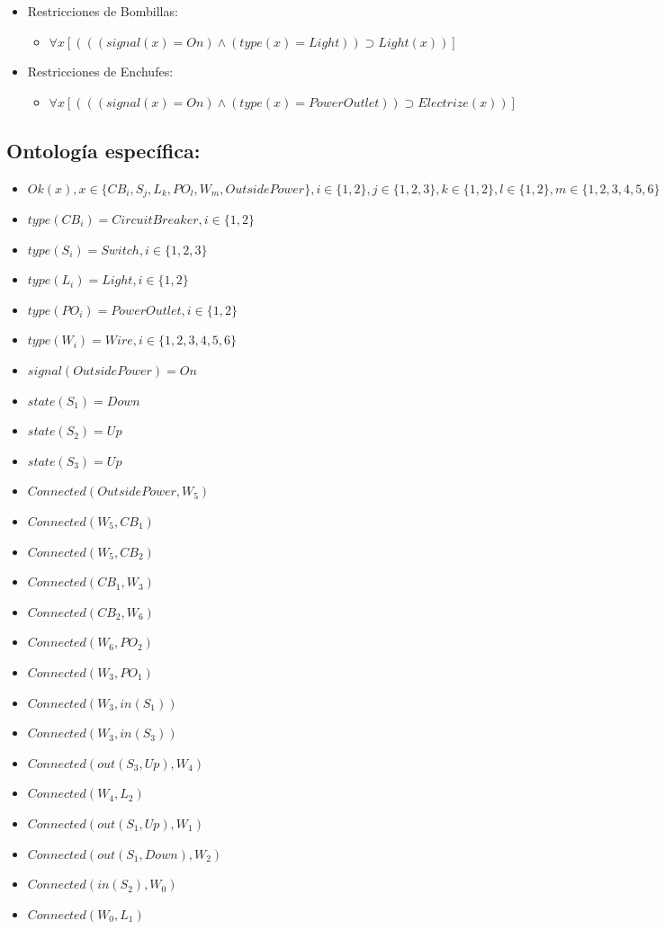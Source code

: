 \documentclass[10pt, a4paper,spanish]{article}
\begin{document}
\begin{itemize}
				\item Restricciones de Bombillas:
				\begin{itemize}
					\item$ \forall x [(((signal(x) = On) \land (type(x) = Light) )  \supset Light(x))] $
				\end{itemize}

				\item Restricciones de Enchufes:
				\begin{itemize}
					\item$ \forall x [(((signal(x) = On) \land (type(x) = PowerOutlet) )  \supset Electrize(x))] $
				\end{itemize}
			\end{itemize}

		\subsection{Ontología específica:}

			\begin{itemize}
				\item $ Ok(x),  x \in \{CB_i, S_j, L_k, PO_l, W_m, OutsidePower\}, i \in \{1,2\}, j \in \{1,2,3\},k \in \{1,2\},l \in \{1,2\},m \in \{1,2,3,4,5,6\}$
				\item $ type(CB_i) = CircuitBreaker, i \in \{1,2\} $
				\item $ type(S_i) = Switch, i \in \{1,2, 3\} $
				\item $ type(L_i) = Light, i \in \{1,2\} $
				\item $ type(PO_i) = PowerOutlet, i \in \{1,2\} $
				\item $ type(W_i) = Wire, i \in \{1,2, 3, 4, 5, 6\} $
				\item $ signal(OutsidePower) = On $
				\item $ state(S_1) = Down $
				\item $ state(S_2) = Up $
				\item $ state(S_3) = Up $
				\item $ Connected(OutsidePower, W_5)$
				\item $ Connected(W_5, CB_1)$
				\item $ Connected(W_5, CB_2)$
				\item $ Connected(CB_1, W_3)$
				\item $ Connected(CB_2, W_6)$
				\item $ Connected(W_6, PO_2)$
				\item $ Connected(W_3, PO_1)$
				\item $ Connected(W_3, in(S_1))$
				\item $ Connected(W_3, in(S_3))$
				\item $ Connected(out(S_3, Up), W_4)$
				\item $ Connected(W_4, L_2)$
				\item $ Connected(out(S_1, Up), W_1)$
				\item $ Connected(out(S_1, Down), W_2)$
				\item $ Connected(in(S_2), W_0)$
				\item $ Connected(W_0, L_1)$
			\end{itemize}
\end{document}
